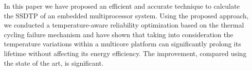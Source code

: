 In this paper we have proposed an efficient and accurate technique to calculate the SSDTP of an embedded multiprocessor system. Using the proposed approach, we conducted a temperature-aware reliability optimization based on the thermal cycling failure mechanism and have shown that taking into consideration the temperature variations within a multicore platform can significantly prolong its lifetime without affecting its energy efficiency. The improvement, compared using the state of the art, is significant.
